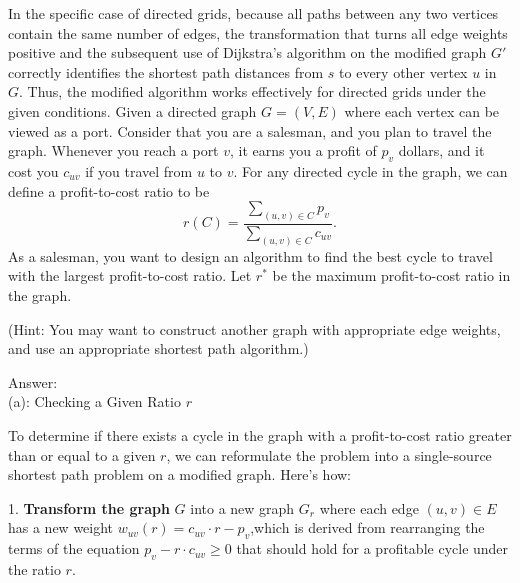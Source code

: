 \documentclass{oxmathproblems}
\begin{document}
\begin{questions}
In the specific case of directed grids, because all paths between any two vertices contain the same number of edges, the transformation that turns all edge weights positive and the subsequent use of Dijkstra’s algorithm on the modified graph \( G' \) correctly identifies the shortest path distances from \( s \) to every other vertex \( u \) in \( G \). Thus, the modified algorithm works effectively for directed grids under the given conditions.
\miquestion [25]
  Given a directed graph $G=(V,E)$ where each vertex can be viewed as a port. Consider that you are a salesman, and you plan to travel the graph. Whenever you reach a port $v$, it earns you a profit of $p_v$ dollars, and it cost you $c_{uv}$ if you travel from $u$ to $v$. For any directed cycle in the graph, we can define a profit-to-cost ratio to be
  $$
    r(C) = \frac{\sum_{(u,v)\in C}p_v}{\sum_{(u,v)\in C}c_{uv}}.
  $$ 
  As a salesman, you want to design an algorithm to find the best cycle to travel with the largest profit-to-cost ratio. Let $r^*$ be the maximum profit-to-cost ratio in the graph. 
  (Hint: You may want to construct another graph with appropriate edge weights, and use an appropriate shortest path algorithm.)

Answer:\\
(a): Checking a Given Ratio $r$

To determine if there exists a cycle in the graph with a profit-to-cost ratio greater than or equal to a given $r$, we can reformulate the problem into a single-source shortest path problem on a modified graph. Here's how:

1. \textbf{Transform the graph} $G$ into a new graph $G_r$ where each edge $(u,v) \in E$ has a new weight $w_{uv}(r) = c_{uv} \cdot r - p_v$,which is derived from rearranging the terms of the equation $p_v - r \cdot c_{uv} \geq 0$ that should hold for a profitable cycle under the ratio $r$.


\end{questions}
\end{document}
